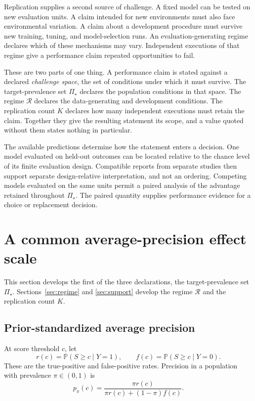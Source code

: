 \documentclass[11pt]{article}
\newcommand{\Regime}{\mathcal{R}}
\newcommand{\PSet}{\Pi_\star}
\newcommand{\Prb}{\mathbb{P}}
\theoremstyle{remark}
\begin{document}
Replication supplies a second source of challenge. A fixed model can be tested on new evaluation units. A claim intended for new environments must also face environmental variation. A claim about a development procedure must survive new training, tuning, and model-selection runs. An evaluation-generating regime declares which of these mechanisms may vary. Independent executions of that regime give a performance claim repeated opportunities to fail.

These are two parts of one thing. A performance claim is stated against a declared \emph{challenge space}, the set of conditions under which it must survive. The target-prevalence set $\PSet$ declares the population conditions in that space. The regime $\Regime$ declares the data-generating and development conditions. The replication count $K$ declares how many independent executions must retain the claim. Together they give the resulting statement its scope, and a value quoted without them states nothing in particular.


The available predictions determine how the statement enters a decision. One model evaluated on held-out outcomes can be located relative to the chance level of its finite evaluation design. Compatible reports from separate studies then support separate design-relative interpretation, and not an ordering. Competing models evaluated on the same units permit a paired analysis of the advantage retained throughout $\PSet$. The paired quantity supplies performance evidence for a choice or replacement decision.

\section{A common average-precision effect scale}
\label{sec:common-scale}

This section develops the first of the three declarations, the target-prevalence set $\PSet$. Sections~\ref{sec:regime} and \ref{sec:support} develop the regime $\Regime$ and the replication count $K$.

\subsection{Prior-standardized average precision}

At score threshold $c$, let
\[
r(c)=\Prb(S\geq c\mid Y=1),
\qquad
f(c)=\Prb(S\geq c\mid Y=0).
\]
These are the true-positive and false-positive rates. Precision in a population with prevalence $\pi\in(0,1)$ is
\begin{equation}
p_\pi(c)
=
\frac{\pi r(c)}
{\pi r(c)+(1-\pi)f(c)}.
\label{eq:reference-precision}
\end{equation}
\end{document}

